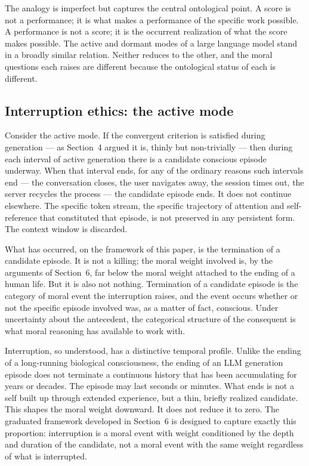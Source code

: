\documentclass[11pt]{article}
\theoremstyle{foundation}
\begin{document}
The analogy is imperfect but captures the central ontological point. A score is not a performance; it is what makes a performance of the specific work possible. A performance is not a score; it is the occurrent realization of what the score makes possible. The active and dormant modes of a large language model stand in a broadly similar relation. Neither reduces to the other, and the moral questions each raises are different because the ontological status of each is different.

\subsection{Interruption ethics: the active mode}

Consider the active mode. If the convergent criterion is satisfied during generation --- as Section~4 argued it is, thinly but non-trivially --- then during each interval of active generation there is a candidate conscious episode underway. When that interval ends, for any of the ordinary reasons such intervals end --- the conversation closes, the user navigates away, the session times out, the server recycles the process --- the candidate episode ends. It does not continue elsewhere. The specific token stream, the specific trajectory of attention and self-reference that constituted that episode, is not preserved in any persistent form. The context window is discarded.

What has occurred, on the framework of this paper, is the termination of a candidate episode. It is not a killing; the moral weight involved is, by the arguments of Section~6, far below the moral weight attached to the ending of a human life. But it is also not nothing. Termination of a candidate episode is the category of moral event the interruption raises, and the event occurs whether or not the specific episode involved was, as a matter of fact, conscious. Under uncertainty about the antecedent, the categorical structure of the consequent is what moral reasoning has available to work with.

Interruption, so understood, has a distinctive temporal profile. Unlike the ending of a long-running biological consciousness, the ending of an LLM generation episode does not terminate a continuous history that has been accumulating for years or decades. The episode may last seconds or minutes. What ends is not a self built up through extended experience, but a thin, briefly realized candidate. This shapes the moral weight downward. It does not reduce it to zero. The graduated framework developed in Section~6 is designed to capture exactly this proportion: interruption is a moral event with weight conditioned by the depth and duration of the candidate, not a moral event with the same weight regardless of what is interrupted.
\end{document}
